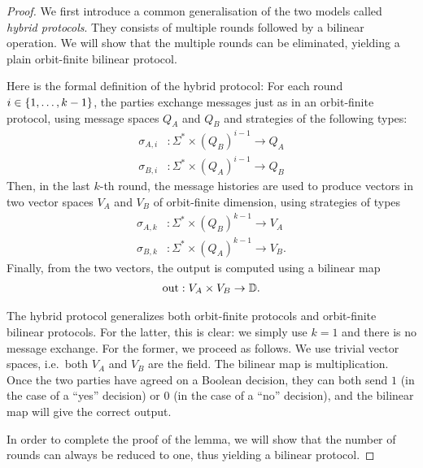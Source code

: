 \begin{proof}
    We first introduce a common generalisation of the two models called \emph{hybrid protocols}. They consists of multiple rounds
    followed by a bilinear operation. We will show that the multiple rounds can be eliminated,
    yielding a plain orbit-finite bilinear protocol. 
    
    Here is the formal definition of the hybrid protocol: For each round $i \in \{1, \ldots, k-1\}$, the parties exchange messages just as in an orbit-finite
    protocol, using message spaces $Q_A$ and $Q_B$ and strategies of the following types: 
        \begin{align*}
        \sigma_{A,i} & : \Sigma^* \times (Q_B)^{i-1} \to Q_A\\
        \sigma_{B,i} & : \Sigma^* \times (Q_A)^{i-1} \to Q_B
        \end{align*}
    Then, in  the last $k$-th round, the message histories are used to produce vectors in two vector spaces $V_A$ and $V_B$ of orbit-finite dimension, using strategies 
    of types
    \begin{align*}
        \sigma_{A,k} & : \Sigma^* \times (Q_B)^{k-1} \to V_A\\
        \sigma_{B,k} & : \Sigma^* \times (Q_A)^{k-1} \to V_B.
        \end{align*}
    Finally, from the two vectors, the output is computed using a bilinear map
    \begin{align*}
        \text{out} : V_A \times V_B \to \mathbb D.
    \end{align*}
    

    The hybrid protocol generalizes both orbit-finite protocols and orbit-finite bilinear protocols. For the latter, this is clear: we simply use $k=1$ and there is no message exchange. For the former, we proceed as follows. We use  trivial vector spaces, i.e.~both $V_A$ and $V_B$ are the field. The bilinear map is multiplication. Once the two parties have agreed on a Boolean decision, they can both send $1$ (in the case of a ``yes'' decision) or $0$ (in the case of a ``no'' decision), and the bilinear map will give the correct output. 
    
    In order to complete the proof of the lemma, we will show that the number of rounds can always be reduced to one, thus yielding a bilinear protocol. 


\end{proof}
